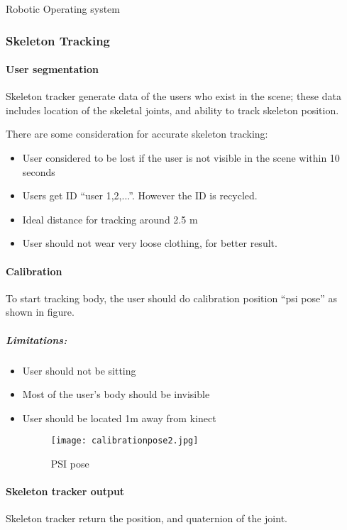 \documentclass[a4paper]{book}
\begin{document}
\begin{chapter}{Robotic Operating system}
\subsubsection {Skeleton Tracking}
\paragraph{User segmentation}
Skeleton tracker generate  data of the users who exist in the scene; these data includes location of the skeletal joints, and ability to track skeleton position.

There are some consideration for accurate skeleton tracking:
\begin{itemize}
	\item User considered to be lost if the user is not visible in the scene within 10 seconds
	\item Users get ID “user 1,2,...”. However the ID is recycled.
	
	\item Ideal distance for tracking around 2.5 m
	\item User should not wear very loose clothing, for better result.
	
\end{itemize}
\paragraph{Calibration}
To start tracking body, the user should do calibration position “psi pose” as shown in figure.



      \subparagraph {Limitations:}
\begin{itemize}
	\item User should not be sitting
	\item Most of the user’s body should be invisible
	\item User should be located 1m away from kinect
	\begin{figure}[ht]
		\centering
		\caption{PSI pose}
		\texttt{[image: calibrationpose2.jpg]}
	\end{figure}
\end{itemize}

\paragraph{Skeleton tracker output}

Skeleton tracker return the position, and quaternion of the joint.



\end{chapter}
\end{document}
